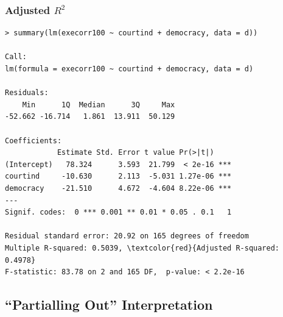 \documentclass[xcolor=svgnames,9pt,english,aspectratio=169,t]{beamer}
\begin{document}
\begin{frame}[fragile]
\frametitle{Adjusted $R^2$}
\begin{Verbatim}[fontsize=\footnotesize, frame=single, label=R Code, commandchars=\\\{\}]
> summary(lm(execorr100 ~ courtind + democracy, data = d))

Call:
lm(formula = execorr100 ~ courtind + democracy, data = d)

Residuals:
    Min      1Q  Median      3Q     Max
-52.662 -16.714   1.861  13.911  50.129

Coefficients:
            Estimate Std. Error t value Pr(>|t|)
(Intercept)   78.324      3.593  21.799  < 2e-16 ***
courtind     -10.630      2.113  -5.031 1.27e-06 ***
democracy    -21.510      4.672  -4.604 8.22e-06 ***
---
Signif. codes:  0 *** 0.001 ** 0.01 * 0.05 . 0.1   1

Residual standard error: 20.92 on 165 degrees of freedom
Multiple R-squared: 0.5039,	\textcolor{red}{Adjusted R-squared: 0.4978}
F-statistic: 83.78 on 2 and 165 DF,  p-value: < 2.2e-16
\end{Verbatim}
\end{frame}




\subsection{``Partialling Out'' Interpretation}
\end{document}
